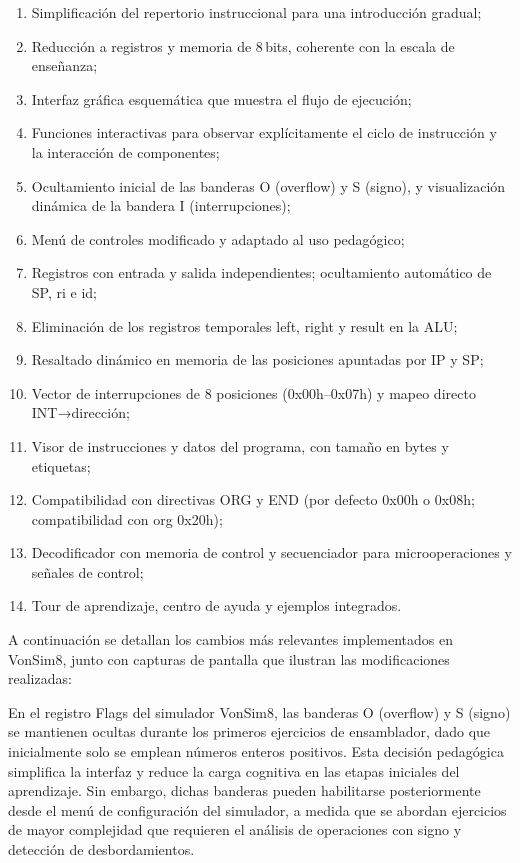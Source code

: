 \documentclass[12pt,oneside]{templates/unerthesis}
\providecommand{\tightlist}{%
  \setlength{\itemsep}{0pt}\setlength{\parskip}{0pt}}
\begin{document}
\begin{enumerate}
\def\labelenumi{\arabic{enumi}.}
\tightlist
\item
  Simplificación del repertorio instruccional para una introducción gradual;
\item
  Reducción a registros y memoria de 8\,bits, coherente con la escala de enseñanza;
\item
  Interfaz gráfica esquemática que muestra el flujo de ejecución;
\item
  Funciones interactivas para observar explícitamente el ciclo de instrucción y la interacción de componentes;
\item
  Ocultamiento inicial de las banderas O (overflow) y S (signo), y visualización dinámica de la bandera I (interrupciones);
\item
  Menú de controles modificado y adaptado al uso pedagógico;
\item
  Registros con entrada y salida independientes; ocultamiento automático de SP, ri e id;
\item
  Eliminación de los registros temporales left, right y result en la ALU;
\item
  Resaltado dinámico en memoria de las posiciones apuntadas por IP y SP;
\item
  Vector de interrupciones de 8 posiciones (0x00h--0x07h) y mapeo directo INT→dirección;
\item
  Visor de instrucciones y datos del programa, con tamaño en bytes y etiquetas;
\item
  Compatibilidad con directivas ORG y END (por defecto 0x00h o 0x08h; compatibilidad con org 0x20h);
\item
  Decodificador con memoria de control y secuenciador para microoperaciones y señales de control;
\item
  Tour de aprendizaje, centro de ayuda y ejemplos integrados.
\end{enumerate}

A continuación se detallan los cambios más relevantes implementados en VonSim8, junto con capturas de pantalla que ilustran las modificaciones realizadas:

En el registro Flags del simulador VonSim8, las banderas O (overflow) y S (signo) se mantienen ocultas durante los primeros ejercicios de ensamblador, dado que inicialmente solo se emplean números enteros positivos. Esta decisión pedagógica simplifica la interfaz y reduce la carga cognitiva en las etapas iniciales del aprendizaje. Sin embargo, dichas banderas pueden habilitarse posteriormente desde el menú de configuración del simulador, a medida que se abordan ejercicios de mayor complejidad que requieren el análisis de operaciones con signo y detección de desbordamientos.
\end{document}
